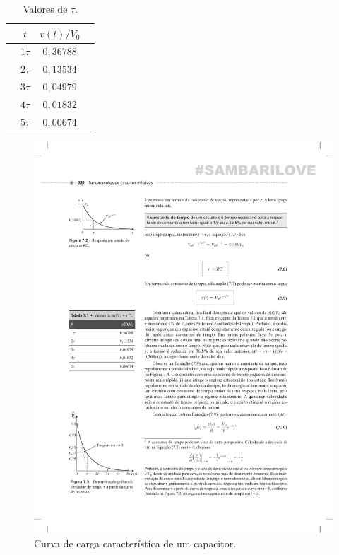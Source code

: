 \begin{table}
\begin{center}
\caption{Valores de $\tau$.}
\begin{tabular}{@{}cccc@{}}
\toprule
 & \textbf{$t$}  &\textbf{ $v(t)/V_0$} & \\ \midrule
 & $1\tau$ & $0,36788$ & \\
 & $2\tau$ & $0,13534$ & \\
 & $3\tau$ & $0,04979$ & \\
 & $4\tau$ & $0,01832$ & \\
 & $5\tau$ & $0,00674$ & \\ \bottomrule
\end{tabular}
\end{center}  
\label{tb:capacitor}
\end{table}

\begin{figure}
  \caption{Curva de carga característica de um capacitor.}
  \begin{center}
      \includegraphics[scale=1]{img/capacitor.pdf}
  \end{center}
  \label{fig:capacitor}
\end{figure}


